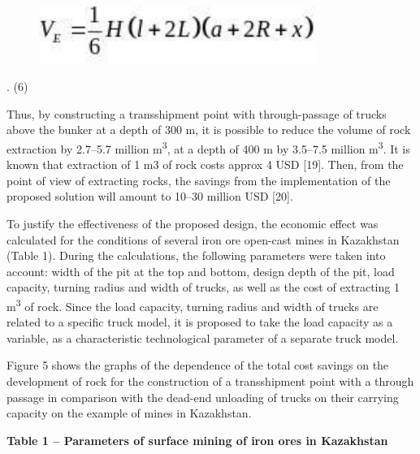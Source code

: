 \begin{figure}[H]
	\centering
	\includegraphics[width=0.8\textwidth]{assets/1359}
	\caption*{}
\end{figure}. (6)

Thus, by constructing a transshipment point with through-passage of
trucks above the bunker at a depth of 300 m, it is possible to reduce
the volume of rock extraction by 2.7--5.7 million m\textsuperscript{3},
at a depth of 400 m by 3.5--7.5 million m\textsuperscript{3}. It is
known that extraction of 1 m3 of rock costs approx 4 USD {[}19{]}. Then,
from the point of view of extracting rocks, the savings from the
implementation of the proposed solution will amount to 10--30 million
USD {[}20{]}.

To justify the effectiveness of the proposed design, the economic effect
was calculated for the conditions of several iron ore open-cast mines in
Kazakhstan (Table 1). During the calculations, the following parameters
were taken into account: width of the pit at the top and bottom, design
depth of the pit, load capacity, turning radius and width of trucks, as
well as the cost of extracting 1 m\textsuperscript{3} of rock. Since the
load capacity, turning radius and width of trucks are related to a
specific truck model, it is proposed to take the load capacity as a
variable, as a characteristic technological parameter of a separate
truck model.

Figure 5 shows the graphs of the dependence of the total cost savings on
the development of rock for the construction of a transshipment point
with a through passage in comparison with the dead-end unloading of
trucks on their carrying capacity on the example of mines in Kazakhstan.

{\bfseries Table 1 -- Parameters of surface mining of iron ores in
Kazakhstan}

